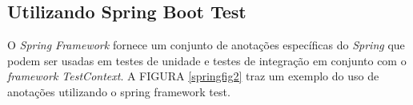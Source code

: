 





 







\subsection{Utilizando Spring Boot Test}

O \textit{Spring Framework} fornece um conjunto de anotações específicas do \textit{Spring} que podem ser usadas em testes de unidade e testes de integração em conjunto com o \textit{framework TestContext}.  A FIGURA \ref{springfig2} traz um exemplo do uso de anotações utilizando o spring framework test.


